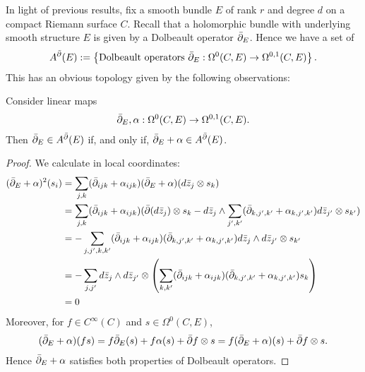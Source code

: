 \documentclass[12pt]{ociamthesis}  %
\begin{document}
In light of previous results, fix a smooth bundle $E$ of rank $r$
and degree $d$ on a compact Riemann surface $C$.
Recall that a holomorphic bundle with underlying smooth structure $E$
is given by a Dolbeault operator $\bar{\partial}_E$. Hence we have a set of
\begin{align*}
  A^{\bar{\partial}} (E) := \left\lbrace{
    \text{Dolbeault operators $\bar{\partial}_E : \Omega^0(C,E) \to \Omega^{0,1}(C,E)$}
  }\right\rbrace.
\end{align*}
This has an obvious topology given by the following observations:
\begin{lemma}\label{lem:affine_space_of_dolbeault_operators}
  Consider linear maps
  \begin{align*}
    \bar{\partial}_E,\alpha : \Omega^0(C,E) \to \Omega^{0,1}(C,E).
  \end{align*}
  Then $\bar{\partial}_E\in A^{\bar{\partial}} (E)$ if, and only if, $\bar{\partial}_E+\alpha\in A^{\bar{\partial}} (E)$.
  \begin{proof}
    We calculate in local coordinates:
    \begin{align*}
      (\bar{\partial}_E + \alpha)^2(s_i)
       & = \sum_{j,k} (\bar{\partial}_{ijk} + \alpha_{ijk})(\bar{\partial}_E + \alpha)( d\bar z_j\otimes s_k)                                                                                     \\
       & = \sum_{j,k} (\bar{\partial}_{ijk} + \alpha_{ijk})(\bar{\partial}(d\bar z_j) \otimes s_k -  d\bar z_j \wedge \sum_{j',k'}(\bar{\partial}_{k,j',k'} + \alpha_{k,j',k'}) d\bar z_{j'}\otimes s_{k'}) \\
       & = - \sum_{j,j',k,k'} (\bar{\partial}_{ijk} + \alpha_{ijk})(\bar{\partial}_{k,j',k'} + \alpha_{k,j',k'}) d\bar z_j \wedge d\bar z_{j'}\otimes s_{k'}                                      \\
       & = - \sum_{j,j'}
      d\bar z_j \wedge d\bar z_{j'}\otimes \left(
      \sum_{k,k'} (\bar{\partial}_{ijk} + \alpha_{ijk})(\bar{\partial}_{k,j',k'} + \alpha_{k,j',k'}) s_{k}\right)                                                                                 \\
       & = 0
    \end{align*}
    Moreover, for $f\in C^\infty(C)$ and $s\in\Omega^0(C,E)$,
    \begin{align*}
      (\bar{\partial}_E + \alpha)(fs) = f\bar{\partial}_E(s) + f\alpha(s) + \bar{\partial} f \otimes s
      = f(\bar{\partial}_E+\alpha)(s) + \bar{\partial} f \otimes s.
    \end{align*}
    Hence $\bar{\partial}_E + \alpha$ satisfies both properties of Dolbeault
    operators.
  \end{proof}
\end{lemma}
\end{document}
